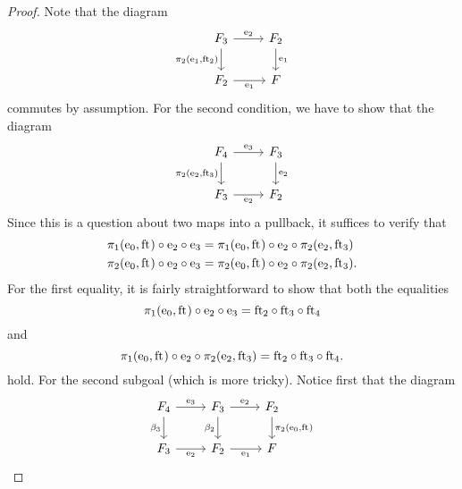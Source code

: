 \begin{proof}
Note that the diagram
\begin{equation*}
\begin{tikzcd}
\stesysf_3
  \ar{d}[swap]{\pullbackpr{2}{\efamext}{\eft[2]}}
  \ar{r}{\eext{2}}
  & 
\stesysf_2 
  \ar{d}{\efamext} 
  \\
\stesysf_2 
  \ar{r}[swap]{\efamext} 
  &
\stesysf
\end{tikzcd}
\end{equation*}
commutes by assumption. For the second condition, we have to show that the
diagram
\begin{equation*}
\begin{tikzcd}
\stesysf_4
  \ar{d}[swap]{\pullbackpr{2}{\eext{2}}{\eft[3]}}
  \ar{r}{\eext{3}}
  & 
\stesysf_3
  \ar{d}{\eext{2}} 
  \\
\stesysf_3
  \ar{r}[swap]{\eext{2}} 
  &
\stesysf_2
\end{tikzcd}
\end{equation*}
Since this is a question about two maps into a pullback, it suffices to verify
that
\begin{align*}
\pullbackpr{1}{\ectxext}{\eft}\circ\eext{2}\circ\eext{3}
  & =
\pullbackpr{1}{\ectxext}{\eft}\circ\eext{2}\circ\pullbackpr{2}{\eext{2}}{\eft[3]}
  \\
\pullbackpr{2}{\ectxext}{\eft}\circ\eext{2}\circ\eext{3}
  & =
\pullbackpr{2}{\ectxext}{\eft}\circ\eext{2}\circ\pullbackpr{2}{\eext{2}}{\eft[3]}.
\end{align*}
For the first equality, it is fairly straightforward to show that both the
equalities
\begin{equation*}
\pullbackpr{1}{\ectxext}{\eft}\circ\eext{2}\circ\eext{3}
  =
\eft[2]\circ\eft[3]\circ\eft[4]
\end{equation*}
and
\begin{equation*}
\pullbackpr{1}{\ectxext}{\eft}\circ\eext{2}\circ\pullbackpr{2}{\eext{2}}{\eft[3]}
  =
\eft[2]\circ\eft[3]\circ\eft[4].
\end{equation*}
hold. For the second subgoal (which is more tricky). Notice first that the
diagram
\begin{equation*}
\begin{tikzcd}
\stesysf_4
  \ar{r}{\eext{3}}
  \ar{d}[swap]{\beta_3}
  &
\stesysf_3
  \ar{r}{\eext{2}}
  \ar{d}[swap]{\beta_2}
  &
\stesysf_2
  \ar{d}{\pullbackpr{2}{\ectxext}{\eft}}
  \\
\stesysf_3
  \ar{r}[swap]{\eext{2}}
  &
\stesysf_2
  \ar{r}[swap]{\efamext}
  &
\stesysf
\end{tikzcd}

\end{equation*}
\end{proof}
